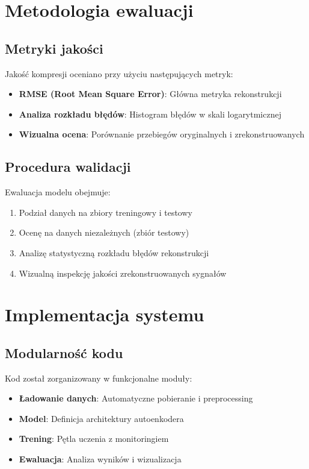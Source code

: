 \documentclass[12pt,a4paper]{article}
\begin{document}
\section{Metodologia ewaluacji}

\subsection{Metryki jakości}

Jakość kompresji oceniano przy użyciu następujących metryk:

\begin{itemize}
    \item \textbf{RMSE (Root Mean Square Error)}: Główna metryka rekonstrukcji
    \item \textbf{Analiza rozkładu błędów}: Histogram błędów w skali logarytmicznej
    \item \textbf{Wizualna ocena}: Porównanie przebiegów oryginalnych i zrekonstruowanych
\end{itemize}

\subsection{Procedura walidacji}

Ewaluacja modelu obejmuje:
\begin{enumerate}
    \item Podział danych na zbiory treningowy i testowy
    \item Ocenę na danych niezależnych (zbiór testowy)
    \item Analizę statystyczną rozkładu błędów rekonstrukcji
    \item Wizualną inspekcję jakości zrekonstruowanych sygnałów
\end{enumerate}

\section{Implementacja systemu}

\subsection{Modularność kodu}

Kod został zorganizowany w funkcjonalne moduły:
\begin{itemize}
    \item \textbf{Ładowanie danych}: Automatyczne pobieranie i preprocessing
    \item \textbf{Model}: Definicja architektury autoenkodera
    \item \textbf{Trening}: Pętla uczenia z monitoringiem
    \item \textbf{Ewaluacja}: Analiza wyników i wizualizacja
\end{itemize}
\end{document}
